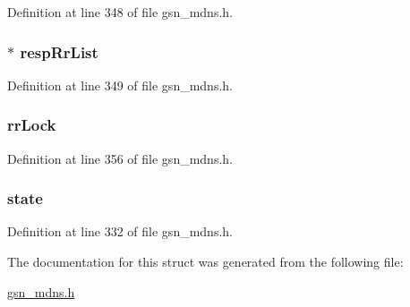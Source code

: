 Definition at line 348 of file gsn\_\-mdns.h.

\hypertarget{a00140_a97a30be7d167f7f9475f806a189936b4}{
\subsubsection[{respRrList}]{$\ast$ {\bf respRrList}}}
\label{a00140_a97a30be7d167f7f9475f806a189936b4}


Definition at line 349 of file gsn\_\-mdns.h.

\hypertarget{a00140_a2c92e0949538471898a153c53e505bed}{
\subsubsection[{rrLock}]{ {\bf rrLock}}}
\label{a00140_a2c92e0949538471898a153c53e505bed}


Definition at line 356 of file gsn\_\-mdns.h.

\hypertarget{a00140_a6e9c4cbd32a1178b12f3a61f6855c896}{
\subsubsection[{state}]{ {\bf state}}}
\label{a00140_a6e9c4cbd32a1178b12f3a61f6855c896}


Definition at line 332 of file gsn\_\-mdns.h.



The documentation for this struct was generated from the following file:\begin{DoxyCompactItemize}
\item 
\hyperlink{a00526}{gsn\_\-mdns.h}\end{DoxyCompactItemize}
